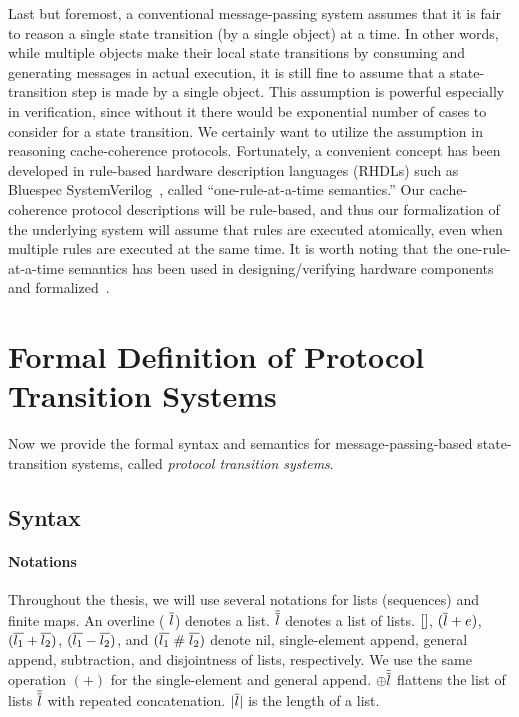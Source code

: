 Last but foremost, a conventional message-passing system assumes that it is fair to reason a single state transition (by a single object) at a time.
In other words, while multiple objects make their local state transitions by consuming and generating messages in actual execution, it is still fine to assume that a state-transition step is made by a single object.
This assumption is powerful especially in verification, since without it there would be exponential number of cases to consider for a state transition.
We certainly want to utilize the assumption in reasoning cache-coherence protocols.
Fortunately, a convenient concept has been developed in rule-based hardware description languages (RHDLs) such as Bluespec SystemVerilog~\cite{bluespec}, called ``one-rule-at-a-time semantics.''
Our cache-coherence protocol descriptions will be rule-based, and thus our formalization of the underlying system will assume that rules are executed atomically, even when multiple rules are executed at the same time.
It is worth noting that the one-rule-at-a-time semantics has been used in designing/verifying hardware components~\cite{Murali:2015,Dave:2005,Dave:2007} and formalized~\cite{fesi,kami,koika}.

\section{Formal Definition of Protocol Transition Systems}

Now we provide the formal syntax and semantics for message-passing-based state-transition systems, called \emph{protocol transition systems}.

\subsection{Syntax}
\label{sec-syntax}

\paragraph{Notations}
Throughout the thesis, we will use several notations for lists (sequences) and finite maps.
An overline (\eg{} $\overline{l}$) denotes a list.
$\overline{\overline{l}}$ denotes a list of lists.
$\lbrack\rbrack{}$, $(\overline{l} + e)$, $(\overline{l_1} + \overline{l_2})$, $(\overline{l_1} - \overline{l_2})$, and
$(\overline{l_1} \; \# \; \overline{l_2})$ denote nil, single-element append, general append, subtraction, and disjointness of lists, respectively.
We use the same operation $(+)$ for the single-element and general append.
$\oplus \overline{\overline{l}}$ flattens the list of lists $\overline{\overline{l}}$ with repeated concatenation.
$| \overline{l} |$ is the length of a list.

